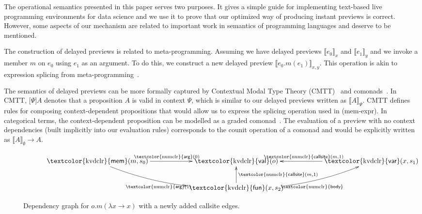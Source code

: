 \documentclass[english,crc,references=cleveref]{programming}
\theoremstyle{plain}
\theoremstyle{definition}
\newcommand{\bnd}[1]{\textnormal{\textcolor{kvdclr}{\sffamily #1}}}
\newcommand{\blbl}[1]{\textnormal{\textcolor{numclr}{\sffamily #1}}}
\newcommand{\rname}[1]{{\sffamily(#1)}}
\begin{document}
The operational semantics presented in this paper serves two purposes. It gives a simple guide
for implementing text-based live programming environments for data science and we use it to prove that
our optimized way of producing instant previews is correct. However, some aspects of our mechanism
are related to important work in semantics of programming languages and deserve to be mentioned.

The construction of delayed previews is related to meta-programming. Assuming
we have delayed previews $\llbracket e_0 \rrbracket_x$ and $\llbracket e_1 \rrbracket_y$ and
we invoke a member $m$ on $e_0$ using $e_1$ as an argument. To do this, we construct a new
delayed preview $\llbracket e_0.m(e_1) \rrbracket_{x, y}$. This operation is akin to expression
splicing from meta-programming~\cite{metaml,quotations}.

The semantics of delayed previews can be more formally captured by Contextual Modal Type Theory
(CMTT)~\cite{cmtt} and comonads~\cite{cmtt-denotation}. In CMTT, $\lbrack \Psi \rbrack A$ denotes
that a proposition $A$ is valid in context $\Psi$, which is similar to our delayed previews written
as $\llbracket A \rrbracket_\Psi$. CMTT defines rules for composing context-dependent propositions
that would allow us to express the splicing operation used in \rname{mem-expr}. In categorical
terms, the context-dependent proposition can be modelled as a graded comonad~\cite{effectrev,graded}.
The evaluation of a preview with no context dependencies (built implicitly into our evaluation rules)
corresponds to the counit operation of a comonad and would be explicitly written as
$\llbracket A \rrbracket_\emptyset \rightarrow A$.


\begin{figure}
\vspace{-0.5em}
\begin{equation*}
\hspace{3em}
\xymatrix{
\bnd{mem}(m, s_0) \ar@/_1pc/[drr]_{\blbl{arg}(1)} \ar[rr]^{\blbl{arg}(0)} && \bnd{val}(o) && \bnd{var}(x, s_1)\ar[ll]_{\blbl{callsite}(m, 1)} \\
&&\bnd{fun}(x, s_2) \ar[u]_{\blbl{callsite}(m, 1)} \ar@/_1pc/[rru]_{\blbl{body}} &&
}
\end{equation*}
\vspace{-0.5em}
\caption{Dependency graph for $o.m(\lambda x\rightarrow x)$ with a newly added \blbl{callsite} edges.}
\label{fig:graph-func}
\vspace{-0.5em}
\end{figure}
\end{document}

